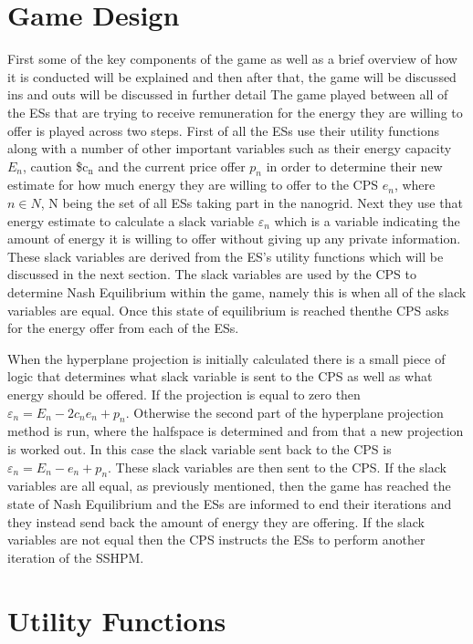 \documentclass[a4paper, notitlepage]{report}
\begin{document}
\section{Game Design}
\label{sec:org3c70179}
First some of the key components of the game as well as a brief overview of how
it  is conducted will be explained and then after that, the game will be
discussed ins and outs will be discussed in further detail The game played
between all of the ESs that are trying to receive remuneration for the energy
they are willing to offer is played across two steps. First of all the ESs use
their utility functions along with a number of other important variables such as
their energy capacity \(E_n\), caution \$c\(_{\text{n}}\) and the current price offer \(p_n\) in
order to determine their new estimate for how much energy they are willing to
offer to the CPS \(e_n\), where \(n \in N\), N being the set of all ESs taking part in
the nanogrid. Next they use that energy estimate to calculate a slack variable
\(\varepsilon_n\) which is a variable indicating the amount of energy it is willing to offer
without giving up any private information. These slack variables are derived
from the ES's utility functions which will be discussed in the next section. The
slack variables are used by the CPS to determine Nash Equilibrium within the
game, namely this is when all of the slack variables are equal. Once this state
of equilibrium is reached thenthe CPS asks for the energy offer from each of the
ESs.

When the hyperplane projection is initially calculated there is a small piece of
logic that determines what slack variable is sent to the CPS as well as what
energy should be offered. If the projection is equal to zero then \(\varepsilon_n = E_n -
2c_{n}e_{n} + p_n\). Otherwise the second part of the hyperplane projection method is
run, where the halfspace is determined and from that a new projection is worked
out. In this case the slack variable sent back to the CPS is \(\varepsilon_n = E_n - e_n +
p_n\). These slack variables are then sent to the CPS. If the slack variables are
all equal, as previously mentioned, then the game has reached the state of Nash
Equilibrium and the ESs are informed to end their iterations and they instead
send back the amount of energy they are offering. If the slack variables are not
equal then the CPS instructs the ESs to perform another iteration of the SSHPM.
\section{Utility Functions}
\label{sec:org66a7b03}
\end{document}
